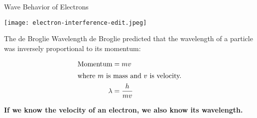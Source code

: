 \documentclass[notes=hide]{beamer}
\begin{document}
\begin{frame}{Wave Behavior of Electrons}
	\begin{center}
		\texttt{[image: electron-interference-edit.jpeg]}
	\end{center}
\end{frame}

\begin{frame}{The de Broglie Wavelength}
	de Broglie predicted that the wavelength of a particle was
	\alert{inversely proportional} to its \alert{momentum}:

	\begin{align*}
		\text{Momentum} &= mv \\
		\intertext{where $m$ is mass and $v$ is velocity.}
		\lambda &= \frac{h}{mv} \\
	\end{align*}

	\begin{center}
		\bfseries{} If we know the velocity of an electron, we also know its
		wavelength.
	\end{center}
\end{frame}
\end{document}

